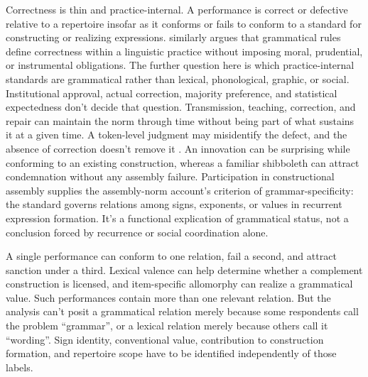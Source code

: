 \documentclass[12pt,letterpaper]{article}
\begin{document}
Correctness is thin and practice-internal. A performance is correct or defective
relative to a repertoire insofar as it conforms or fails to conform to a standard
for constructing or realizing expressions. \textcite[213--216]{pullum2019} similarly argues
that grammatical rules define correctness within a linguistic practice without
imposing moral, prudential, or instrumental obligations. The further question here
is which practice-internal standards are grammatical rather than lexical,
phonological, graphic, or social. Institutional approval, actual correction,
majority preference, and statistical expectedness don't decide that question.
Transmission, teaching, correction, and repair can maintain the norm through time
without being part of what sustains it at a given time. A token-level judgment may
misidentify the defect, and the absence of correction doesn't remove it
\citep[104]{coseriu2019}. An
innovation can be surprising while conforming to an existing construction,
whereas a familiar shibboleth can attract condemnation without any assembly
failure. Participation in constructional assembly supplies the assembly-norm
account's
criterion of grammar-specificity: the standard governs relations among signs,
exponents, or values in
recurrent expression formation. It's a functional explication of grammatical
status, not a conclusion forced by recurrence or social coordination alone.

A single performance can conform to one relation, fail a second, and attract
sanction under a third. Lexical valence can help determine
whether a complement construction is licensed, and item-specific allomorphy can
realize a grammatical value. Such performances contain more than one relevant
relation. But the analysis can't posit a grammatical relation merely because some
respondents call the problem \enquote{grammar}, or a lexical relation merely because
others call it \enquote{wording}. Sign identity, conventional value, contribution
to construction formation, and repertoire scope have to be identified independently of
those labels.
\end{document}
